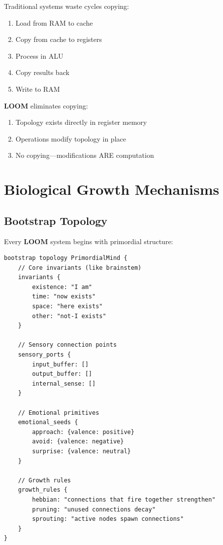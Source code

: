\documentclass[12pt,a4paper,openany]{book} %
\newcommand{\loom}{\textbf{LOOM}}
\begin{document}
Traditional systems waste cycles copying:
\begin{enumerate}
    \item Load from RAM to cache
    \item Copy from cache to registers
    \item Process in ALU
    \item Copy results back
    \item Write to RAM
\end{enumerate}

\loom{} eliminates copying:
\begin{enumerate}
    \item Topology exists directly in register memory
    \item Operations modify topology in place
    \item No copying—modifications ARE computation
\end{enumerate}

\chapter{Biological Growth Mechanisms}

\section{Bootstrap Topology}

Every \loom{} system begins with primordial structure:

\vspace{0.5em}
\begin{lstlisting}[language=loom]
bootstrap topology PrimordialMind {
    // Core invariants (like brainstem)
    invariants {
        existence: "I am"
        time: "now exists"
        space: "here exists"
        other: "not-I exists"
    }

    // Sensory connection points
    sensory_ports {
        input_buffer: []
        output_buffer: []
        internal_sense: []
    }

    // Emotional primitives
    emotional_seeds {
        approach: {valence: positive}
        avoid: {valence: negative}
        surprise: {valence: neutral}
    }

    // Growth rules
    growth_rules {
        hebbian: "connections that fire together strengthen"
        pruning: "unused connections decay"
        sprouting: "active nodes spawn connections"
    }
}
\end{lstlisting}
\vspace{0.5em}
\end{document}
